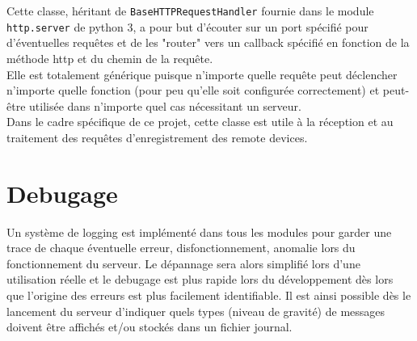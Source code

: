 \documentclass[11pt,a4paper,11pt]{report}
\begin{document}
Cette classe, héritant de \texttt{BaseHTTPRequestHandler} fournie dans le module \texttt{http.server} de python 3, a pour but d'écouter sur un port spécifié pour d'éventuelles requêtes et de les "router" vers un callback spécifié en fonction de la méthode http et du chemin de la requête.\\

Elle est totalement générique puisque n'importe quelle requête peut déclencher n'importe quelle fonction (pour peu qu'elle soit configurée correctement) et peut-être utilisée dans n'importe quel cas nécessitant un serveur.\\

Dans le cadre spécifique de ce projet, cette classe est utile à la réception et au traitement des requêtes d'enregistrement des remote devices.



\section{Debugage}

Un système de logging est implémenté dans tous les modules pour garder une trace de chaque éventuelle erreur, disfonctionnement, anomalie lors du fonctionnement du serveur. Le dépannage sera alors simplifié lors d'une utilisation réelle et le debugage est plus rapide lors du développement dès lors que l'origine des erreurs est plus facilement identifiable. Il est ainsi possible dès le lancement du serveur d'indiquer quels types (niveau de gravité) de messages doivent être affichés et/ou stockés dans un fichier journal.




\end{document}

